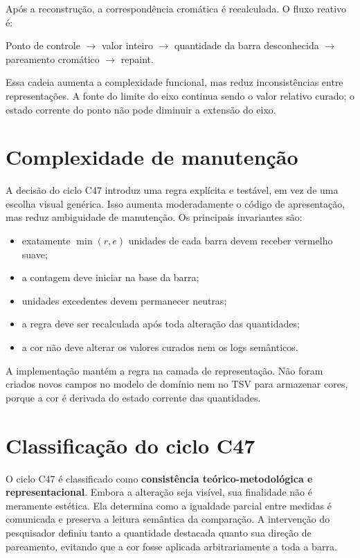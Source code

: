 \documentclass[12pt,a4paper]{article}
\begin{document}
Após a reconstrução, a correspondência cromática é recalculada. O fluxo reativo é:

\begin{center}
Ponto de controle $\rightarrow$ valor inteiro $\rightarrow$ quantidade da barra desconhecida $\rightarrow$ pareamento cromático $\rightarrow$ repaint.
\end{center}

Essa cadeia aumenta a complexidade funcional, mas reduz inconsistências entre representações. A fonte do limite do eixo continua sendo o valor relativo curado; o estado corrente do ponto não pode diminuir a extensão do eixo.

\section{Complexidade de manutenção}

A decisão do ciclo C47 introduz uma regra explícita e testável, em vez de uma escolha visual genérica. Isso aumenta moderadamente o código de apresentação, mas reduz ambiguidade de manutenção. Os principais invariantes são:

\begin{itemize}
  \item exatamente $\min(r,e)$ unidades de cada barra devem receber vermelho suave;
  \item a contagem deve iniciar na base da barra;
  \item unidades excedentes devem permanecer neutras;
  \item a regra deve ser recalculada após toda alteração das quantidades;
  \item a cor não deve alterar os valores curados nem os logs semânticos.
\end{itemize}

A implementação mantém a regra na camada de representação. Não foram criados novos campos no modelo de domínio nem no TSV para armazenar cores, porque a cor é derivada do estado corrente das quantidades.

\section{Classificação do ciclo C47}

O ciclo C47 é classificado como \textbf{consistência teórico-metodológica e representacional}. Embora a alteração seja visível, sua finalidade não é meramente estética. Ela determina como a igualdade parcial entre medidas é comunicada e preserva a leitura semântica da comparação. A intervenção do pesquisador definiu tanto a quantidade destacada quanto sua direção de pareamento, evitando que a cor fosse aplicada arbitrariamente a toda a barra.
\end{document}
